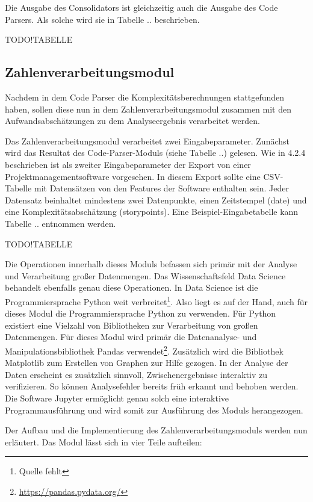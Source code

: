 Die Ausgabe des Consolidators ist gleichzeitig auch die Ausgabe des Code
Parsers. Als solche wird sie in Tabelle .. beschrieben.

TODO!TABELLE

\subsection{Zahlenverarbeitungsmodul}\label{Zahlenverarbeitungsmodul}

Nachdem in dem Code Parser die Komplexitätsberechnungen stattgefunden
haben, sollen diese nun in dem Zahlenverarbeitungsmodul zusammen mit den
Aufwandsabschätzungen zu dem Analyseergebnis verarbeitet werden.

Das Zahlenverarbeitungsmodul verarbeitet zwei Eingabeparameter. Zunächst
wird das Resultat des Code-Parser-Moduls (siehe Tabelle ..) gelesen. Wie
in 4.2.4 beschrieben ist als zweiter Eingabeparameter der Export von
einer Projektmanagementsoftware vorgesehen. In diesem Export sollte eine
CSV-Tabelle mit Datensätzen von den Features der Software enthalten
sein. Jeder Datensatz beinhaltet mindestens zwei Datenpunkte, einen
Zeitstempel (date) und eine Komplexitätsabschätzung (storypoints). Eine
Beispiel-Eingabetabelle kann Tabelle .. entnommen werden.

TODO!TABELLE

Die Operationen innerhalb dieses Moduls befassen sich primär mit der
Analyse und Verarbeitung großer Datenmengen. Das Wissenschaftsfeld Data
Science behandelt ebenfalls genau diese Operationen. In Data Science ist
die Programmiersprache Python weit verbreitet\footnote{Quelle fehlt}.
Also liegt es auf der Hand, auch für dieses Modul die Programmiersprache
Python zu verwenden. Für Python existiert eine Vielzahl von Bibliotheken
zur Verarbeitung von großen Datenmengen. Für dieses Modul wird primär
die Datenanalyse- und Manipulationsbibliothek Pandas
verwendet\footnote{\url{https://pandas.pydata.org/}}. Zusätzlich wird
die Bibliothek Matplotlib zum Erstellen von Graphen zur Hilfe gezogen.
In der Analyse der Daten erscheint es zusätzlich sinnvoll,
Zwischenergebnisse interaktiv zu verifizieren. So können Analysefehler
bereits früh erkannt und behoben werden. Die Software Jupyter ermöglicht
genau solch eine interaktive Programmausführung und wird somit zur
Ausführung des Moduls herangezogen.

Der Aufbau und die Implementierung des Zahlenverarbeitungsmoduls werden
nun erläutert. Das Modul lässt sich in vier Teile aufteilen:

